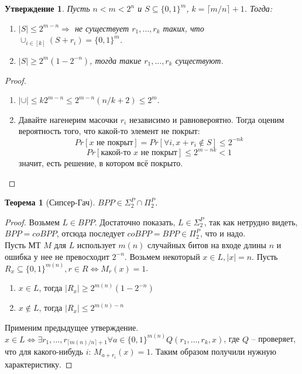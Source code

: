\documentclass[12pt, letterpaper]{article}
\newtheorem{theorem}{Теорема}[section]
\newtheorem{prop}{Утверждение}[section]
\begin{document}
\begin{prop} 
Пусть $n < m < 2^n$ и $S \subseteq \{0,1\}^m$, $k=\lceil m/n \rceil + 1$. Тогда:
\begin{enumerate}
\item $|S| \leq 2^{m-n} \Longrightarrow$ не существует $r_1, \ldots, r_k$ таких, что $\cup_{i \in [k]} (S+r_i) = \{0, 1\}^m$.

\item $|S| \geq 2^m (1- 2^{-n})$, тогда такие $r_1, \ldots, r_k$ существуют.
\end{enumerate}
\end{prop}
\begin{proof}
\begin{enumerate}

\item $|\cup| \leq k 2^{m-n} \leq 2^{m-n} (n/k+2) \leq 2^m$.
\item Давайте нагенерим масочки $r_i$ независимо и равновероятно. Тогда оценим вероятность того, что какой-то элемент не покрыт:
$$ 
Pr[x \text{ не покрыт}] = Pr[\forall i, x+r_i \notin S] \leq 2^{-nk} 
$$
$$
Pr[\text{какой-то } x \text{ не покрыт}] \leq 2^{m-nk} < 1
$$ значит, есть решение, в котором всё покрыто.
\end{enumerate}
\end{proof}

\begin{theorem}[Сипсер-Гач]
$BPP \in \Sigma^P_2 \cap \Pi^P_2$.
\end{theorem}
\begin{proof}
Возьмем $L \in BPP$. Достаточно показать, $L \in \Sigma^P_2$, так как нетрудно видеть, $BPP = coBPP$, отсюда последует $coBPP = BPP \in \Pi^P_2$, что и надо.\\
Пусть МТ $M$ для $L$ использует $m(n)$ случайных битов на входе длины $n$ и ошибка у нее не превосходит $2^{-n}$.
Возьмем некоторый $x \in L, |x|=n$. Пусть $R_x \subseteq \{0,1\}^{m(n)}, r \in R \Longleftrightarrow M_r(x) = 1$.
\begin{enumerate}
\item $x \in L$, тогда $|R_x| \geq 2^{m(n)}(1-2^{-n})$
\item $x \notin L$, тогда $|R_x| \leq 2^{m(n)-n}$
\end{enumerate}
Применим предыдущее утверждение. \\
$x \in L \Leftrightarrow \exists r_1, \ldots, r_{\lceil m(n)/n \rceil+1} \forall a \in \{0,1\}^{m(n)} Q(r_1, \ldots, r_k, x)$, где $Q$ -- проверяет, что для какого-нибудь $i$: $M_{a+r_i}(x)=1$. Таким образом получили нужную характеристику. 
\end{proof}
\end{document}
